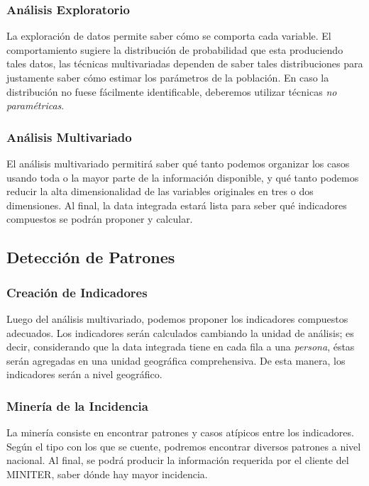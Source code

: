 \documentclass{article}
\begin{document}
\subsubsection{Análisis Exploratorio}

La exploración de datos permite saber cómo se comporta cada variable. El comportamiento sugiere la distribución de probabilidad que esta produciendo tales datos, las técnicas multivariadas dependen de saber tales distribuciones para justamente saber cómo estimar los parámetros de la población. En caso la distribución no fuese fácilmente identificable, deberemos utilizar técnicas \emph{no paramétricas}\cite{hollander_nonparametric_2014}.

\subsubsection{Análisis Multivariado}
El análisis multivariado permitirá saber qué tanto podemos organizar los casos usando toda o la mayor parte de la información disponible, y qué tanto podemos reducir la alta dimensionalidad de las variables originales en tres o dos dimensiones. Al final, la data integrada estará lista para seber qué indicadores compuestos se podrán proponer y calcular.

\subsection{Detección de Patrones}
\subsubsection{Creación de Indicadores}
Luego del análisis multivariado, podemos proponer los indicadores compuestos adecuados. Los indicadores serán calculados cambiando la unidad de análisis; es decir, considerando que la data integrada tiene en cada fila a una \emph{persona}, éstas serán agregadas en una unidad geográfica comprehensiva. De esta manera, los indicadores serán a nivel geográfico. 

\subsubsection{Minería de la Incidencia}
La minería consiste en encontrar patrones y casos atípicos entre los indicadores. Según el tipo con los que se cuente, podremos encontrar diversos patrones a nivel nacional. Al final, se podrá producir la información requerida por el cliente del MINITER, saber dónde hay mayor incidencia.
\end{document}
